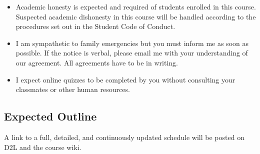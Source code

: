 \documentclass[letterpaper,10pt]{article}
\begin{document}
\begin{itemize}
\item Academic honesty is expected and required of students enrolled
  in this course.  Suspected academic dishonesty in this course will
  be handled according to the procedures set out in the Student Code
  of Conduct.

\item I am sympathetic to family emergencies but you must inform me as
  soon as possible. If the notice is verbal, please email me with your
  understanding of our agreement. All agreements have to be in
  writing.

\item I expect online quizzes to be completed by you without consulting your classmates or other human resources.
\end{itemize}


\subsection{Expected Outline}
A link to a full, detailed, and continuously updated schedule will be
posted on D2L and the course wiki.
\end{document}
